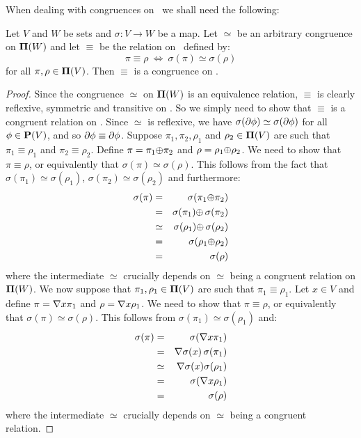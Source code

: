 When dealing with congruences on \pvs\ we shall need the following:
\begin{prop}\label{logic:prop:FUAP:substitution:congruence}
Let $V$ and $W$ be sets and $\sigma:V\to W$ be a map. Let $\simeq$
be an arbitrary congruence on ${\bf\Pi}(W)$ and let $\equiv$ be the
relation on \pvs\ defined by:
    \[
    \pi\equiv\rho\ \Leftrightarrow\ \sigma(\pi)\simeq\sigma(\rho)
    \]
for all $\pi,\rho\in\mbox{${\bf\Pi}(V)$}$. Then $\equiv$ is a congruence on \pvs.
\end{prop}
\begin{proof}
Since the congruence $\simeq$ on ${\bf\Pi}(W)$ is an equivalence
relation, $\equiv$ is clearly reflexive, symmetric and transitive on
\pvs. So we simply need to show that $\equiv$ is a congruent
relation on \pvs. Since $\simeq$ is reflexive, we have
$\sigma(\mbox{$\partial$}\phi)\simeq\sigma(\mbox{$\partial$}\phi)$ for all $\phi\in\mbox{${\bf P}(V)$}$,  and
so $\mbox{$\partial$}\phi\equiv\mbox{$\partial$}\phi$. Suppose $\pi_{1},\pi_{2},\rho_{1}$ and
$\rho_{2}\in\mbox{${\bf\Pi}(V)$}$ are such that $\pi_{1}\equiv\rho_{1}$ and
$\pi_{2}\equiv\rho_{2}$. Define $\pi=\pi_{1}\mbox{$\oplus$}\pi_{2}$ and
$\rho=\rho_{1}\mbox{$\oplus$}\rho_{2}$. We need to show that $\pi\equiv\rho$,
or equivalently that $\sigma(\pi)\simeq\sigma(\rho)$. This follows
from the fact that $\sigma(\pi_{1})\simeq\sigma(\rho_{1})$,
$\sigma(\pi_{2})\simeq\sigma(\rho_{2})$ and furthermore:
    \begin{eqnarray*}
    \sigma(\pi)&=&\sigma(\pi_{1}\mbox{$\oplus$}\pi_{2})\\
    &=&\sigma(\pi_{1})\mbox{$\oplus$}\,\sigma(\pi_{2})\\
    &\simeq&\sigma(\rho_{1})\mbox{$\oplus$}\,\sigma(\rho_{2})\\
    &=&\sigma(\rho_{1}\mbox{$\oplus$}\rho_{2})\\
    &=&\sigma(\rho)
    \end{eqnarray*}
where the intermediate $\simeq$ crucially depends on $\simeq$ being
a congruent relation on ${\bf\Pi}(W)$. We now suppose that
$\pi_{1},\rho_{1}\in\mbox{${\bf\Pi}(V)$}$ are such that $\pi_{1}\equiv\rho_{1}$. Let
$x\in V$ and define $\pi=\mbox{$\nabla$} x\pi_{1}$ and $\rho=\mbox{$\nabla$} x\rho_{1}$.
We need to show that $\pi\equiv\rho$, or equivalently that
$\sigma(\pi)\simeq\sigma(\rho)$. This follows from
$\sigma(\pi_{1})\simeq\sigma(\rho_{1})$ and:
    \begin{eqnarray*}
    \sigma(\pi)&=&\sigma(\mbox{$\nabla$} x\pi_{1})\\
    &=&\mbox{$\nabla$}\sigma(x)\,\sigma(\pi_{1})\\
    &\simeq&\mbox{$\nabla$}\sigma(x)\sigma(\rho_{1})\\
    &=&\sigma(\mbox{$\nabla$} x\rho_{1})\\
    &=&\sigma(\rho)
    \end{eqnarray*}
where the intermediate $\simeq$ crucially depends on $\simeq$ being
a congruent relation.
\end{proof}
